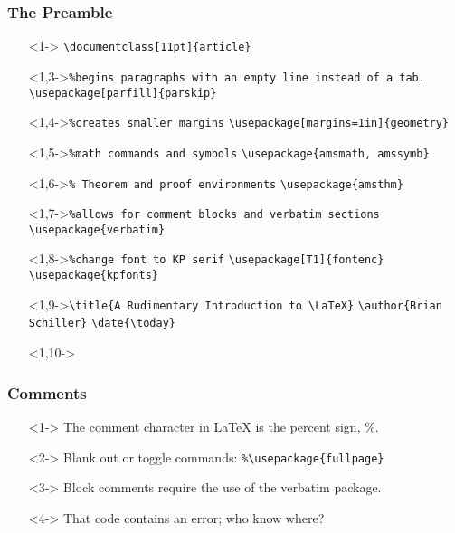 \begin{frame}[fragile]
	\frametitle{The Preamble}
	\vspace{-12pt}
\begin{itemize}
\item[]<1-> \verb|\documentclass[11pt]{article}| \vspace{-12pt}
\item[]<1,3->\verb|%begins paragraphs with an empty line instead of a tab.|
\verb|\usepackage[parfill]{parskip}|

\item[]<1,4->\verb|%creates smaller margins|
\verb|\usepackage[margins=1in]{geometry}|

\item[]<1,5->\verb|%math commands and symbols|
\verb|\usepackage{amsmath, amssymb}|

\item[]<1,6->\verb|% Theorem and proof environments|
\verb|\usepackage{amsthm}|

\item[]<1,7->\verb|%allows for comment blocks and verbatim sections|
\verb|\usepackage{verbatim}|

\item[]<1,8->\verb|%change font to KP serif|
\verb|\usepackage[T1]{fontenc}|
\verb|\usepackage{kpfonts}|

\item[]<1,9->\verb|\title{A Rudimentary Introduction to \LaTeX}|
\verb|\author{Brian Schiller}|
\verb|\date{\today}|
\item[]<1,10->\verb||
\end{itemize}

\end{frame}

\begin{frame}[fragile]
	\frametitle{Comments}
	\begin{itemize}
	\item[]<1-> The comment character in \LaTeX{} is the percent sign, \%.
	\item[]<2-> Blank out or toggle commands:
		\verb|%\usepackage{fullpage}|
	\item[]<3-> Block comments require the use of the verbatim package.
	\item[]<4-> That code contains an error; who know where?
	\end{itemize}
\end{frame}

